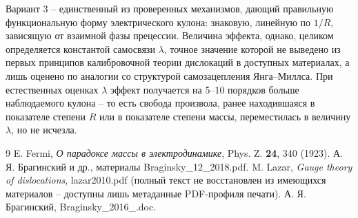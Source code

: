 \documentclass[12pt,a4paper]{article}
\begin{document}
Вариант 3 -- единственный из проверенных механизмов, дающий правильную
функциональную форму электрического кулона: знаковую, линейную по
$1/R$, зависящую от взаимной фазы прецессии. Величина эффекта, однако,
целиком определяется константой самосвязи $\lambda$, точное значение
которой не выведено из первых принципов калибровочной теории дислокаций
в доступных материалах, а лишь оценено по аналогии со структурой
самозацепления Янга--Миллса. При естественных оценках $\lambda$
эффект получается на 5--10 порядков больше наблюдаемого кулона -- то есть
свобода произвола, ранее находившаяся в показателе степени $R$ или в
показателе степени массы, переместилась в величину $\lambda$, но не
исчезла.

\begin{thebibliography}{9}
 E. Fermi, {\it О парадоксе массы в электродинамике},
Phys. Z. {\bf 24}, 340 (1923).
 А. Я. Брагинский и др., материалы Braginsky\_12\_2018.pdf.
 M. Lazar, {\it Gauge theory of dislocations},
lazar2010.pdf (полный текст не восстановлен из имеющихся материалов --
доступны лишь метаданные PDF-профиля печати).
 А. Я. Брагинский, Braginsky\_2016\_.doc.
\end{thebibliography}
\end{document}
